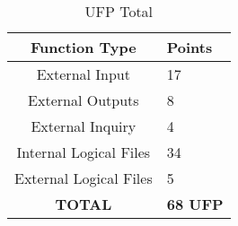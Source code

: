 \begin{table}[h]
\caption{UFP Total}
\begin{tabularx}{\textwidth}{|c|X|}
\hline
\textbf{Function Type}      &  \textbf{Points}
\\ \hline
External Input		& 17
\\ \hline
External Outputs & 8
\\ \hline
External Inquiry & 4
\\ \hline
Internal Logical Files & 34
\\ \hline
External Logical Files & 5
\\ \hline
\textbf{TOTAL} & \textbf{68 UFP}
\\ \hline


\end{tabularx}
\end{table}




